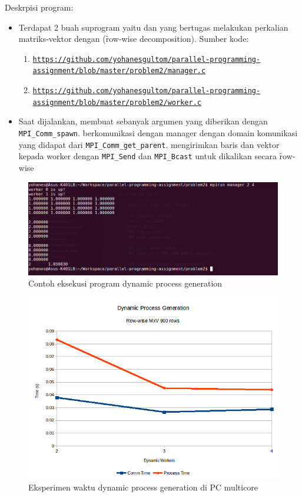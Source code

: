 Deskrpisi program: 
\begin{itemize}
	\item Terdapat 2 buah suprogram yaitu \manager dan \worker yang bertugas melakukan perkalian matriks-vektor dengan (\f{row-wise decomposition}). Sumber kode:
	\begin{enumerate}
		\item \texttt{\url{https://github.com/yohanesgultom/parallel-programming-assignment/blob/master/problem2/manager.c}}
		\item \texttt{\url{https://github.com/yohanesgultom/parallel-programming-assignment/blob/master/problem2/worker.c}}
	\end{enumerate}	
	\item Saat dijalankan, \manager membuat \worker sebanyak argumen yang diberikan dengan \verb|MPI_Comm_spawn|. \Worker berkomunikasi dengan manager dengan domain komunikasi yang didapat dari \verb|MPI_Comm_get_parent|. \Manager mengirimkan baris dan vektor kepada worker dengan \verb|MPI_Send| dan \verb|MPI_Bcast| untuk dikalikan secara \f{row-wise}
\end{itemize}

\begin{figure}
	\centering
	\includegraphics[width=1\textwidth]
	{pics/dynamic_process_demo}
	\caption{Contoh eksekusi program dynamic process generation}
	\label{fig:dynamic_process_demo}
\end{figure}  

\begin{figure}
	\centering
	\includegraphics[width=1\textwidth]
	{pics/dynamic_process_multicore}
	\caption{Eksperimen waktu dynamic process generation di PC multicore}
	\label{fig:dynamic_process_multicore}
\end{figure}  

